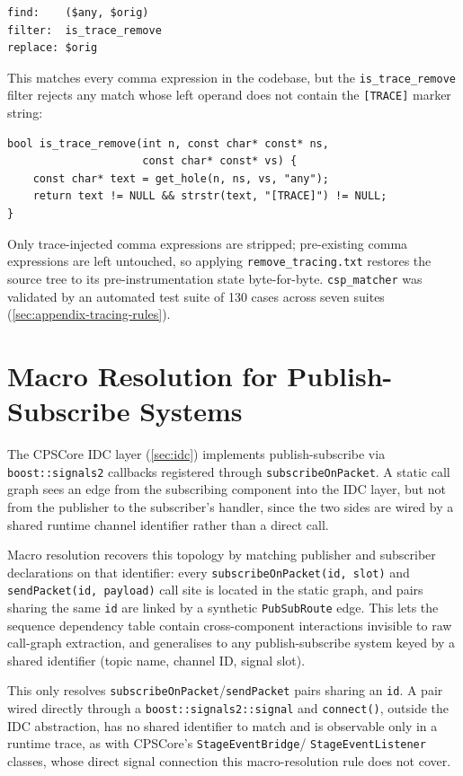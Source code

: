 \begin{verbatim}
find:    ($any, $orig)
filter:  is_trace_remove
replace: $orig
\end{verbatim}

This matches every comma expression in the codebase, but the
\texttt{is\_trace\_remove} filter rejects any match whose left operand
does not contain the \texttt{[TRACE]} marker string:

\begin{verbatim}
bool is_trace_remove(int n, const char* const* ns,
                     const char* const* vs) {
    const char* text = get_hole(n, ns, vs, "any");
    return text != NULL && strstr(text, "[TRACE]") != NULL;
}
\end{verbatim}

Only trace-injected comma expressions are stripped; pre-existing comma
expressions are left untouched, so applying
\texttt{remove\_tracing.txt} restores the source tree to its
pre-instrumentation state byte-for-byte. \texttt{csp\_matcher} was
validated by an automated test suite of 130 cases across seven suites
(\cref{sec:appendix-tracing-rules}).

\section{Macro Resolution for Publish-Subscribe Systems}\label{sec:macro-resolution}

The CPSCore IDC layer (\cref{sec:idc}) implements publish-subscribe via
\texttt{boost::signals2} callbacks registered through
\texttt{subscribeOnPacket}. A static call graph sees an edge from the
subscribing component into the IDC layer, but not from the publisher to
the subscriber's handler, since the two sides are wired by a shared
runtime channel identifier rather than a direct call.

Macro resolution recovers this topology by matching publisher and
subscriber declarations on that identifier: every
\texttt{subscribeOnPacket(id, slot)} and \texttt{sendPacket(id, payload)}
call site is located in the static graph, and pairs sharing the same
\texttt{id} are linked by a synthetic \texttt{PubSubRoute} edge. This
lets the sequence dependency table contain cross-component interactions
invisible to raw call-graph extraction, and generalises to any
publish-subscribe system keyed by a shared identifier (topic name,
channel ID, signal slot).

This only resolves \texttt{subscribeOnPacket}/\texttt{sendPacket} pairs
sharing an \texttt{id}. A pair wired directly through a
\texttt{boost::signals2::signal} and \texttt{connect()}, outside the IDC
abstraction, has no shared identifier to match and is observable only in
a runtime trace, as with CPSCore's \texttt{StageEventBridge}/%
\texttt{StageEventListener} classes, whose direct signal connection this
macro-resolution rule does not cover.


